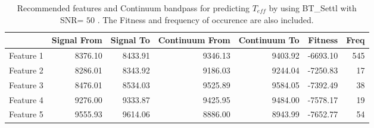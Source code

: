 {{{{\begin{table}
\begin{center}
\begin{tabular}{rrrrrrr}
  \hline
 & Signal From & Signal To & Continuum From & Continuum To & Fitness & Freq \\ 
  \hline
Feature 1 & 8376.10 & 8433.91 & 9346.13 & 9403.92 & -6693.10 & 545 \\ 
  Feature 2 & 8286.01 & 8343.92 & 9186.03 & 9244.04 & -7250.83 &  17 \\ 
  Feature 3 & 8476.01 & 8534.03 & 9525.89 & 9584.05 & -7392.49 &  38 \\ 
  Feature 4 & 9276.00 & 9333.87 & 9425.95 & 9484.00 & -7578.17 &  19 \\ 
  Feature 5 & 9555.93 & 9614.06 & 8886.00 & 8943.99 & -7652.77 &  54 \\ 
   \hline
\end{tabular}
\caption {Recommended features and Continuum bandpass for predicting $ T_{eff} $ 
      by using BT\_Settl with SNR= $ 50 $ . 
      The Fitness and frequency of occurence are also included.} \label{tab:tab_SNR50_T} 
\end{center}
\end{table}


}}}}
